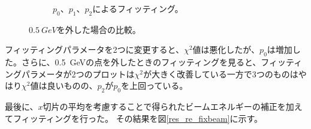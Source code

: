 \begin{figure}[H]
\begin{subfigure}{.5\textwidth}
\begin{center}
			\caption{$p_0$、$p_1$、$p_2$によるフィッティング。}
			\label{fig:sfig2}
		\end{center}
	\end{subfigure}
	\caption[$\SI{0.5}{GeV}$を外した場合の比較。]{$\SI{0.5}{GeV}$を外した場合の比較。}
	\label{res_re_without_low}
\end{figure}

フィッティングパラメータを2つに変更すると、$\chi^2$値は悪化したが、$p_0$は増加した。さらに、\SI{0.5}{GeV}の点を外したときのフィッティングを見ると、フィッティングパラメータが2つのプロットは$\chi^2$が大きく改善している一方で3つのものはやはり$\chi^2$値は良いものの、$p_2$が$p_0$を上回っている。

最後に、$x$切片の平均を考慮することで得られたビームエネルギーの補正を加えてフィッティングを行った。
その結果を図\ref{res_re_fixbeam}に示す。
